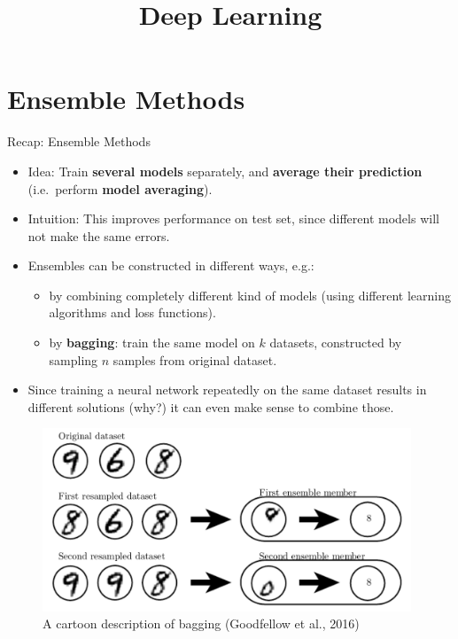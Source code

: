 




\newcommand{\titlefigure}{figure/dropout_goals.png}
\newcommand{\learninggoals}{
  \item Recap: Ensemble Methods
  \item Dropout
  \item Augmentation
}

\title{Deep Learning}
\date{}




\section{Ensemble Methods}
\begin{vbframe}{Recap: Ensemble Methods}

\begin{itemize}
\item Idea: Train \textbf{several models} separately, and \textbf{average their prediction} (i.e.~perform \textbf{model averaging}).
\item Intuition: This improves performance on test set, since different models will not make the same errors.
\item Ensembles can be constructed in different ways, e.g.:
\begin{itemize}
\item by combining completely different kind of models (using different learning algorithms and loss functions).
\item by \textbf{bagging}: train the same model on $k$ datasets, constructed by sampling $n$ samples from original dataset.
\end{itemize}
\item Since training a neural network repeatedly on the same dataset results in different solutions (why?) it can even make sense to combine those.
\end{itemize}

\framebreak 

\begin{figure}
    \centering
      \includegraphics[width=11cm]{figure/bagging.png}
      \caption{A cartoon description of bagging (Goodfellow et al., 2016)}
  \end{figure}

\end{vbframe}

